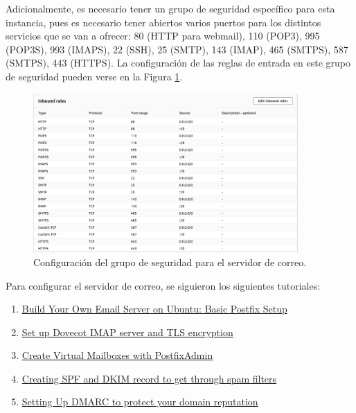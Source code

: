 \documentclass{article}
\begin{document}
Adicionalmente, es necesario tener un grupo de
seguridad espec\'ifico para esta instancia, pues
es necesario tener abiertos varios puertos para
los distintos servicios que se van a ofrecer:
80 (HTTP para webmail), 110 (POP3), 995 (POP3S),
993 (IMAPS), 22 (SSH), 25 (SMTP), 143 (IMAP),
465 (SMTPS), 587 (SMTPS), 443 (HTTPS).   La
configuraci\'on de las reglas de entrada en este
grupo de seguridad pueden verse en la Figura
\ref{fig:email-seguridad}.

\begin{figure}[H]
  \centering
  \includegraphics[width=0.9\textwidth]{email/seguridad}
  \caption{Configuraci\'on del grupo de seguridad para
           el servidor de correo.}
  \label{fig:email-seguridad}
\end{figure}

Para configurar el servidor de correo, se siguieron
los siguientes tutoriales:

\begin{enumerate}
  \item \href{https://www.linuxbabe.com/mail-server/setup-basic-postfix-mail-sever-ubuntu}{Build Your Own Email Server on Ubuntu: Basic Postfix Setup}

  \item \href{https://www.linuxbabe.com/mail-server/secure-email-server-ubuntu-postfix-dovecot}{Set up Dovecot IMAP server and TLS encryption}

  \item \href{https://www.linuxbabe.com/mail-server/postfixadmin-create-virtual-mailboxes-ubuntu-20-04}{Create Virtual Mailboxes with PostfixAdmin}

  \item \href{https://www.linuxbabe.com/mail-server/setting-up-dkim-and-spf}{Creating SPF and DKIM record to get through spam filters}

  \item \href{https://www.linuxbabe.com/mail-server/create-dmarc-record}{Setting Up DMARC to protect your domain reputation}
\end{enumerate}
\end{document}
